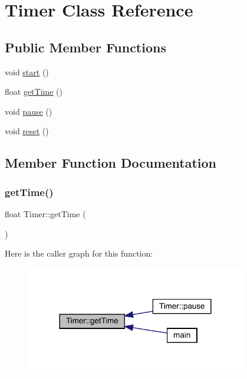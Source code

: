 \hypertarget{class_timer}{}\section{Timer Class Reference}
\label{class_timer}
\subsection*{Public Member Functions}
\begin{DoxyCompactItemize}
\item 
void \mbox{\hyperlink{class_timer_a3a8b5272198d029779dc9302a54305a8}{start}} ()
\item 
float \mbox{\hyperlink{class_timer_a73e3d7fbad6ba5f24dea95e493d15fd1}{get\+Time}} ()
\item 
void \mbox{\hyperlink{class_timer_a0289effad7b573c508bc27e405900a23}{pause}} ()
\item 
void \mbox{\hyperlink{class_timer_a9020542d73357a4eef512eefaf57524b}{reset}} ()
\end{DoxyCompactItemize}


\subsection{Member Function Documentation}
\mbox{\label{class_timer_a73e3d7fbad6ba5f24dea95e493d15fd1}} 
\subsubsection{\texorpdfstring{get\+Time()}{getTime()}}
{\footnotesize\ttfamily float Timer\+::get\+Time (\begin{DoxyParamCaption}{ }\end{DoxyParamCaption})\hspace{0.3cm}{\ttfamily [inline]}}

Here is the caller graph for this function\+:
\nopagebreak
\begin{figure}[H]
\begin{center}
\leavevmode
\includegraphics[width=272pt]{class_timer_a73e3d7fbad6ba5f24dea95e493d15fd1_icgraph}
\end{center}
\end{figure}
\mbox{\label{class_timer_a0289effad7b573c508bc27e405900a23}} 
